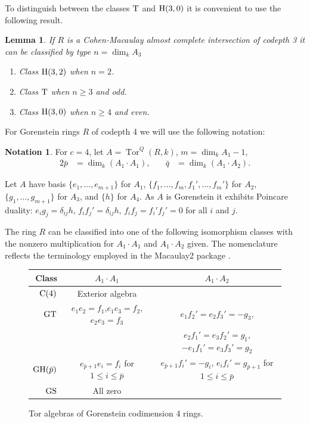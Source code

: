 \documentclass[reqno]{amsart}
\DeclareMathOperator{\rank}{dim}
\DeclareMathOperator{\Tor}{Tor}
\renewcommand{\H}{{\rm H}}
\newcommand{\T}{{\rm T}}
\newcommand{\C}{{\rm C}}
\newcommand{\GT}{{\rm GT}}
\newcommand{\GH}{{\rm GH}}
\newcommand{\GS}{{\rm GS}}
\theoremstyle{plain} %
\newtheorem{lemma}[theorem]{Lemma}
\theoremstyle{definition}
\newtheorem{notation}[theorem]{Notation}
\theoremstyle{remark}
\begin{document}
To distinguish between the classes $\T$ and $\H(3,0)$ it is convenient to use the following result.

\begin{lemma}\label{aci-class} \cite[Proof of Thm 2.]{Avramov-ACI}
    If $R$ is a Cohen-Macaulay almost complete intersection of codepth 3 it can be classified by type $n=\rank_k A_3$
    \begin{enumerate}
        \item Class $\H(3,2)$ when $n=2$.
        \item Class $\T$ when  $n\geq 3$ and odd.
        \item Class $\H(3,0)$ when $n\geq 4$ and even.
    \end{enumerate}
\end{lemma}

For Gorenstein rings $R$ of codepth 4
we will use the following notation:
\begin{notation}\label{Notation Gor tor invariants}
    For $c=4$, 
   let $ A=\Tor^Q(R,k)$, $m=\rank_k A_1-1$,
    \begin{alignat*}{2}
     \bar p&=\rank_k(A_1\cdot A_1),  &\quad \bar q&=\rank_k(A_1\cdot A_2).
\end{alignat*}
    
\end{notation}

Let $A$ have basis $\{e_1,\ldots,e_{m+1}\}$ for $A_1$, $\{f_1,\ldots,f_m,f_1',\ldots,f_m'\}$ for $A_2$, $\{g_1,\ldots,g_{m+1}\}$ for $A_3$, and $\{h\}$ for $A_4$. As $A$ is Gorenstein it exhibits 
Poincare duality: $e_ig_j=\delta_{ij}h$, $f_if_j'=\delta_{ij}h$, $f_if_j=f_i'f_j'=0$ for all $i$ and $j$.  

The ring $R$ can be classified into one of the following isomorphism classes with the  nonzero multiplication for $A_1\cdot A_1$ and $A_1\cdot A_2$ given. The nomenclature reflects the terminology employed in the Macaulay2 package \cite{TorAlgebraSource}.


\begin{figure}[h!]
\renewcommand{\arraystretch}{1.2}
\begin{tabular}{|r|c c| }
    \hline
Class & $A_1\cdot A_1$ & $A_1\cdot A_2$ \\
\hline
 $\C(4)$& 
        Exterior algebra & \\     
 $\GT$ & $e_1e_2=f_1$,$e_1e_3=f_2$, $e_2e_3=f_3$ &
    $e_1f_2'=e_2f_3'=-g_3$, \\
    & & $e_2f_1'=e_3f_2'=g_1$, $-e_1f_1'=e_3f_3'=g_2$ \\    
$\GH(\bar p)$ &  $e_{\bar p+1}e_i=f_i$ for $1\leq i\leq \bar p$ &
    $e_{\bar p+1}f_{i}'=-g_i$, $e_if_i'=g_{\bar p+1}$ for $1\leq i\leq \bar p$\\
    $\GS$ & All zero & \\
        \hline
\end{tabular}
\caption{Tor algebras of Gorenstein codimension 4 rings.}
\label{fig: codim 4}
 \end{figure}
\end{document}
